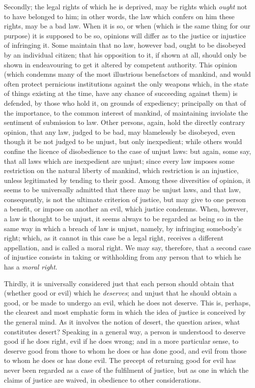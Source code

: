 \documentclass[12pt]{report}
\begin{document}
Secondly; the legal rights of which he is deprived, may be rights which \emph{ought} not to have belonged to him; in other words, the law which confers on him these rights, may be a bad law. When it is so, or when (which is the same thing for our purpose) it is supposed to be so, opinions will differ as to the justice or injustice of infringing it. Some maintain that no law, however bad, ought to be disobeyed by an individual citizen; that his opposition to it, if shown at all, should only be shown in endeavouring to get it altered by competent authority. This opinion (which condemns many of the most illustrious benefactors of mankind, and would often protect pernicious institutions against the only weapons which, in the state of things existing at the time, have any chance of succeeding against them) is defended, by those who hold it, on grounds of expediency; principally on that of the importance, to the common interest of mankind, of maintaining inviolate the sentiment of submission to law. Other persons, again, hold the directly contrary opinion, that any law, judged to be bad, may blamelessly be disobeyed, even though it be not judged to be unjust, but only inexpedient; while others would confine the licence of disobedience to the case of unjust laws: but again, some say, that all laws which are inexpedient are unjust; since every law imposes some restriction on the natural liberty of mankind, which restriction is an injustice, unless legitimated by tending to their good. Among these diversities of opinion, it seems to be universally admitted that there may be unjust laws, and that law, consequently, is not the ultimate criterion of justice, but may give to one person a benefit, or impose on another an evil, which justice condemns. When, however, a law is thought to be unjust, it seems always to be regarded as being so in the same way in which a breach of law is unjust, namely, by infringing somebody's right; which, as it cannot in this case be a legal right, receives a different appellation, and is called a moral right. We may say, therefore, that a second case of injustice consists in taking or withholding from any person that to which he has a \emph{moral right}.

Thirdly, it is universally considered just that each person should obtain that (whether good or evil) which he \emph{deserves}; and unjust that he should obtain a good, or be made to undergo an evil, which he does not deserve. This is, perhaps, the clearest and most emphatic form in which the idea of justice is conceived by the general mind. As it involves the notion of desert, the question arises, what constitutes desert? Speaking in a general way, a person is understood to deserve good if he does right, evil if he does wrong; and in a more particular sense, to deserve good from those to whom he does or has done good, and evil from those to whom he does or has done evil. The precept of returning good for evil has never been regarded as a case of the fulfilment of justice, but as one in which the claims of justice are waived, in obedience to other considerations.
\end{document}
